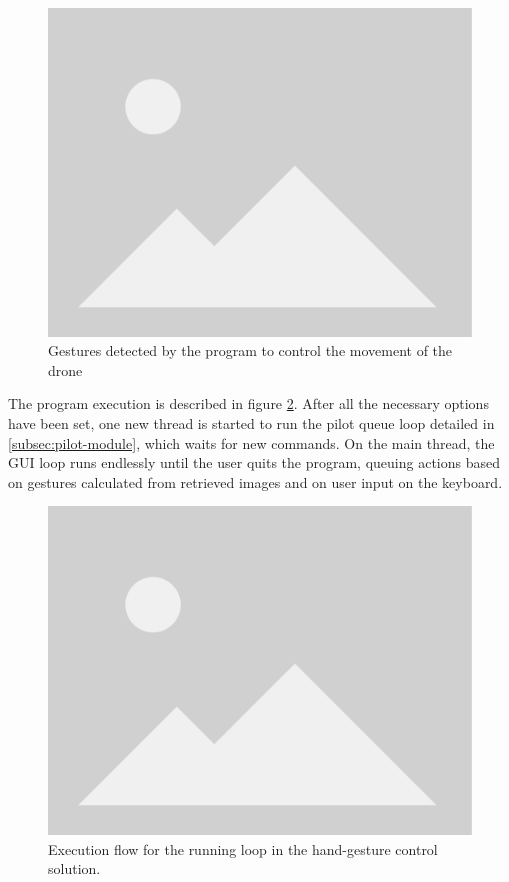 \begin{figure}
  \centering
  \includegraphics[width=\textwidth, keepaspectratio]{img/placeholder.png}
  \caption{Gestures detected by the program to control the movement of the drone}
  \label{fig:hand-gestures}
\end{figure}


The program execution is described in figure \ref{fig:hands-loop}.
After all the necessary options have been set, one new thread is started to run the pilot queue loop detailed in \ref{subsec:pilot-module}, which waits for new commands.
On the main thread, the GUI loop runs endlessly until the user quits the program, queuing actions based on gestures calculated from retrieved images and on user input on the keyboard.
\begin{figure}
  \centering
  \includegraphics[width=\textwidth, keepaspectratio]{img/placeholder.png}
  \caption{Execution flow for the running loop in the hand-gesture control solution.}
  \label{fig:hands-loop}
\end{figure}







